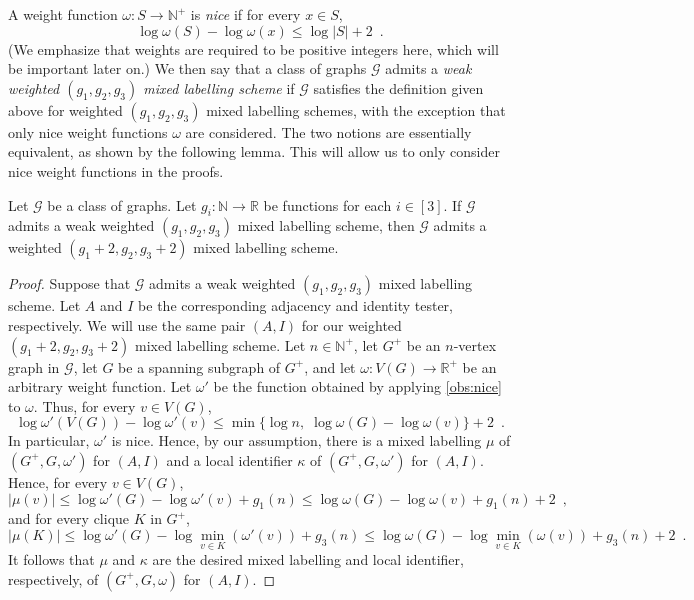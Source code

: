 \documentclass[twoside,leqno]{article}
\newcommand{\R}{\mathbb{R}}
\newcommand{\N}{\mathbb{N}}
\renewcommand{\le}{\leqslant}
\renewcommand{\leq}{\leqslant}
\newcommand{\david}[1]{\noindent{\color{orange} DW: #1}}
\newcommand{\vida}[1]{\noindent{\color{pink} VD: #1}}
\newcommand{\defin}[1]{\emph{\textcolor{brightmaroon}{#1}}}
\begin{document}
A weight function $\omega:S\to \N^+$ is \defin{nice} if
for every $x\in S$,
\[
  \log \omega(S) - \log \omega(x) \leq \log |S| + 2\enspace.
\]
(We emphasize that weights are required to be positive integers here, which will be important later on.)
We then say that a class of graphs $\mathcal{G}$ admits a \defin{weak weighted $(g_1,g_2,g_3)$ mixed labelling scheme} if $\mathcal{G}$ satisfies the definition given above for weighted $(g_1,g_2,g_3)$ mixed labelling schemes, with the exception that only nice weight functions $\omega$ are considered.
The two notions are essentially equivalent, as shown by the following lemma. This will allow us to only consider nice weight functions in the proofs.

\begin{lem}
  \label{lem:nice_weights}
  Let $\mathcal{G}$ be a class of graphs.
  Let $g_i:\N\to\R$ be functions for each $i\in[3]$.
  If $\mathcal{G}$ admits a weak weighted $(g_1,g_2,g_3)$ mixed labelling scheme, then $\mathcal{G}$ admits a weighted $(g_1+2,g_2,g_3+2)$ mixed labelling scheme.
\end{lem}
\begin{proof}
  Suppose that $\mathcal{G}$ admits a weak weighted $(g_1,g_2,g_3)$ mixed labelling scheme.
  Let $A$ and $I$ be the corresponding adjacency and identity tester, respectively.
  We will use the same pair $(A, I)$ for our weighted $(g_1+2,g_2,g_3+2)$ mixed labelling scheme.
  Let $n\in \N^+$, let $G^+$ be an $n$-vertex graph in $\mathcal{G}$, let $G$ be a spanning subgraph of $G^+$, and let $\omega:V(G)\to \R^+$ be an arbitrary weight function.
  Let $\omega'$ be the function obtained by applying \cref{obs:nice} to $\omega$.
  Thus, for every $v\in V(G)$,
  \[
    \log\omega'(V(G))-\log\omega'(v)\le\min\{\log n,\;\log\omega(G)-\log\omega(v)\}+2 \enspace.
  \]
  In particular, $\omega'$ is nice.
  Hence, by our assumption, there is a mixed labelling $\mu$ of $(G^+,G,\omega')$ for $(A,I)$ and a local identifier $\kappa$ of $(G^+,G,\omega')$ for $(A,I)$.
  Hence, for every $v\in V(G)$,
  \[
    |\mu(v)| \leq \log \omega'(G) - \log\omega'(v) + g_1(n) \leq \log \omega(G) - \log\omega(v) + g_1(n) + 2\enspace,
  \]
  and  for every clique $K$ in $G^+$,
  \[
    |\mu(K)|\le \log \omega'(G) - \log\min_{v\in K}(\omega'(v)) + g_3(n)
    \leq \log \omega(G) - \log\min_{v\in K}(\omega(v)) + g_3(n) + 2\enspace.
  \]
  It follows that $\mu$ and  $\kappa$ are the desired  mixed labelling and local identifier, respectively,  of $(G^+,G,\omega)$ for $(A,I)$.
\end{proof}
\end{document}
